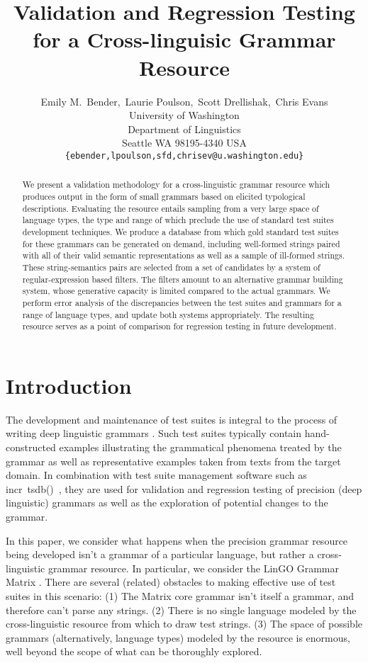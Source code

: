 \documentclass[11pt]{article}
\title{Validation and Regression Testing for a Cross-linguisic Grammar Resource}
\author{Emily M.~Bender,\  Laurie Poulson,\  Scott Drellishak,\ Chris Evans\\
University of Washington\\
Department of Linguistics\\
Seattle WA 98195-4340 USA\\
{\tt \{ebender,lpoulson,sfd,chrisev@u.washington.edu\}}}
\date{}
\newcommand{\itsdb}{\mbox{\sf \lbrack incr tsdb()\rbrack}}
\begin{document}
\maketitle
\begin{abstract}

We present a validation methodology for a
  cross-linguistic grammar resource which produces output in
  the form of small grammars based on elicited typological
  descriptions.  Evaluating the resource entails sampling from a very
  large space of language types, the type and range of which
  preclude the use of standard test suites development
  techniques.  We produce a database from which gold standard test
  suites for these grammars can be generated on demand,
  including well-formed strings paired with all of
  their valid semantic representations as well as a sample of
  ill-formed strings.  These string-semantics pairs are selected from
  a set of candidates by a system of regular-expression based filters.
  The filters amount to an alternative grammar building system, whose
  generative capacity is limited compared to the actual grammars.  We
  perform error analysis of the discrepancies between the test suites
  and grammars for a range of language types, and update both systems
  appropriately.  The resulting resource serves as a point of
  comparison for regression testing in future development.

\end{abstract}


\section{Introduction}

The development and maintenance of test suites is integral to the
process of writing deep linguistic grammars
\cite{Oep:Fli:98,But:Kin:03}.  Such test suites typically contain
hand-constructed examples illustrating the grammatical phenomena 
treated by the grammar as well as representative examples taken
from texts from the target domain.  In combination with test suite
management software such as \itsdb\ \cite{Oepen:02}, they are used for
validation and regression testing of precision (deep linguistic) grammars as well as the
exploration of potential changes to the grammar.  

In this paper, we consider what happens when the precision grammar
resource being developed isn't a grammar of a particular language, but
rather a cross-linguistic grammar resource.  In particular, we
consider the LinGO Grammar Matrix
\cite{Ben:Fli:Oep:02,Ben:Fli:05}.  There are several
(related) obstacles to making effective use of test suites in this
scenario:
(1) The Matrix core grammar isn't itself a grammar, and therefore
can't parse any strings.
(2) There is no single language modeled by the cross-linguistic resource
from which to draw test strings.
(3) The space of possible grammars (alternatively, language types) modeled
by the resource is enormous, well beyond the scope of what can be 
thoroughly explored.
\end{document}
